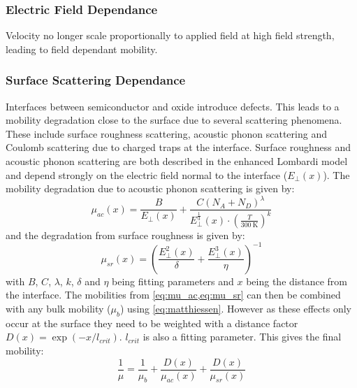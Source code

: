 \subsubsection{Electric Field Dependance}
Velocity no longer scale proportionally to applied field at high field strength, leading to field dependant mobility.

\subsubsection{Surface Scattering Dependance}
Interfaces between semiconductor and oxide introduce defects. This leads to a mobility degradation close to the surface due to several scattering phenomena. These include surface roughness scattering, acoustic phonon scattering and Coulomb scattering due to charged traps at the interface. Surface roughness and acoustic phonon scattering are both described in the enhanced Lombardi model and depend strongly on the electric field normal to the interface ($E_\perp(x)$). The mobility degradation due to acoustic phonon scattering is given by:
\begin{equation} \label{eq:mu_ac}
    \mu_{ac}(x) = \frac{B}{E_\perp(x)} + \frac{C \left( N_A + N_D \right)^\lambda }{E_\perp^{\frac{1}{3}}(x) \cdot \left( \frac{T}{\SI{300}{\kelvin}} \right)^k}
\end{equation}
and the degradation from surface roughness is given by:
\begin{equation} \label{eq:mu_sr}
    \mu_{sr}(x) = \left( \frac{E^2_\perp(x)}{\delta} + \frac{E^3_\perp(x)}{\eta} \right)^{-1}
\end{equation}
with $B$, $C$, $\lambda$, $k$, $\delta$ and $\eta$ being fitting parameters and $x$ being the distance from the interface. The mobilities from \cref{eq:mu_ac,eq:mu_sr} can then be combined with any bulk mobility ($\mu_b$) using \cref{eq:matthiessen}. However as these effects only occur at the surface they need to be weighted with a distance factor $D(x) = \exp(-x/l_{crit})$. $l_{crit}$ is also a fitting parameter. This gives the final mobility:
\begin{equation}
    \frac{1}{\mu} = \frac{1}{\mu_b} + \frac{D(x)}{\mu_{ac}(x)} + \frac{D(x)}{\mu_{sr}(x)}
\end{equation}


